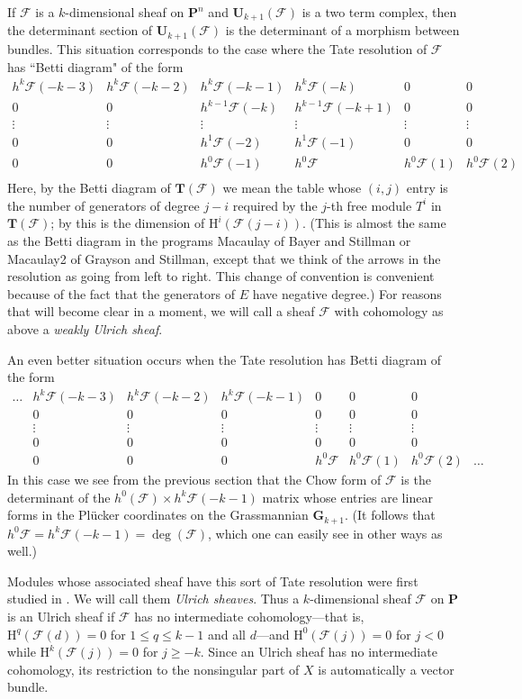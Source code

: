 \documentclass{jams-l}
\theoremstyle{definition}
\theoremstyle{remark}
\newcommand{\F}{{\mathcal F}}
\newcommand{\cF}{{\mathcal F}}
\newcommand{\GG}{{\mathbf G}}
\newcommand{\Hrm}{{\mathrm H}}
\newcommand{\PP}{{\mathbf P}}
\newcommand{\TT}{{\mathbf T}}
\newcommand{\UU}{{\mathbf U}}
\begin{document}
If $\F$ is a $k$-dimensional sheaf on $\PP^n$
and  $\UU_{k+1}(\cF)$ is a two term complex, then the determinant 
section of $\UU_{k+1}(\cF)$ is the
determinant of a morphism between bundles.
This situation corresponds to the case where the Tate resolution
of $\F$ has ``Betti diagram" of the form
\[
\begin{matrix}
h^k\cF(-k-3)  &h^k\cF(-k-2) & h^k\cF(-k-1) & h^k\cF(-k) & 0&0 \\
       0 & 0 &  h^{k-1}\cF(-k) & h^{k-1}\cF(-k+1) &0&0 \\
                  \vdots&\vdots&\vdots&\vdots &\vdots&\vdots \\
0&0&h^1\cF(-2)&h^1\cF(-1)&0&0\\
0&0&h^0\cF(-1)&h^0\cF&h^0\cF(1) &h^0\cF(2)  \\
\end{matrix}
\]
Here, by the Betti diagram of $\TT(\F)$ we mean
the table whose $(i,j)$ entry
is the number of generators
of degree $j-i$ required by the $j$-th free module
$T^i$ in $\TT(\F)$; by \cite{Eisenbudetal.2001} this is the
dimension of $\Hrm^i(\F(j-i))$.
(This is almost the same as the Betti diagram in the programs
Macaulay of Bayer and Stillman or Macaulay2 of Grayson and Stillman,
except that we think of the arrows in the resolution as going
from left to right. This change of convention is convenient because
of the fact that the generators of $E$ have negative degree.)
For reasons that will become clear in a moment, we will call
a sheaf $\F$ with cohomology as above a {\it weakly Ulrich sheaf\/}.

An even better situation occurs when the Tate resolution has 
Betti diagram of the form
\[
\begin{matrix}
\ldots&h^k\cF(-k-3)  &h^k\cF(-k-2) & h^k\cF(-k-1) &0 & 0&0& \\
      & 0 & 0 &  0 & 0 &0&0 \\
                  &\vdots&\vdots&\vdots&\vdots &\vdots&\vdots \\
&0&0&0&0&0&0\\
&0&0&0&h^0\cF&h^0\cF(1) &h^0\cF(2)&\ldots 
\end{matrix}
\]
In this case we see from the previous section that 
the Chow form of $\cF$ is the determinant of the $h^0(\F)
\times h^k\F(-k-1)$ matrix whose entries are
linear forms in the 
Pl\"ucker coordinates on the Grassmannian $\GG_{k+1}$.
(It follows that $h^0\cF = h^k\cF(-k-1)=\deg(\F)$,
which one can easily see in other ways as well.)

Modules whose associated sheaf have this sort of
Tate resolution were first studied in \cite{Ulrich 1984}. 
We will call them {\it Ulrich sheaves}. Thus a $k$-dimensional sheaf $\F$ 
on $\PP$ is
an Ulrich sheaf  if $\F$ has no intermediate cohomology---that 
is, $\Hrm^q(\F(d))=0$ for
$1\leq q\leq k-1$ and all $d$---and
$\Hrm^0(\F(j))= 0$ for $j<0$ while
$\Hrm^k(\F(j))= 0$ for  $j\geq -k$.
Since an Ulrich sheaf has no intermediate cohomology,
its restriction to the nonsingular part of $X$ is automatically
a vector bundle.
\end{document}

